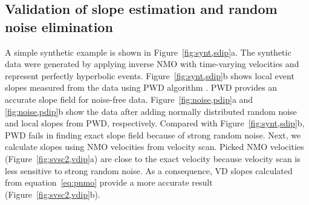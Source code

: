 \subsection{Validation of slope estimation and random noise elimination}
A simple synthetic example is shown in Figure~\ref{fig:synt,sdip}a.
The synthetic data were generated by applying inverse NMO with
time-varying velocities and represent perfectly
hyperbolic events.  Figure~\ref{fig:synt,sdip}b shows local event
slopes measured from the data using PWD algorithm
\cite[]{Fomel02}. PWD provides an accurate slope field for noise-free
data.  Figure~\ref{fig:noise,pdip}a and
\ref{fig:noise,pdip}b show the data after adding normally distributed
random noise and local slopes from PWD, respectively. Compared with
Figure~\ref{fig:synt,sdip}b, PWD fails in finding exact slope field
because of strong random noise. Next, we calculate slopes using NMO
velocities from velocity scan. Picked NMO velocities
(Figure~\ref{fig:svsc2,vdip}a) are close to the exact velocity because
velocity scan is less sensitive to strong random noise. As a
consequence, VD slopes calculated from equation~\ref{eq:pnmo} provide
a more accurate result (Figure~\ref{fig:svsc2,vdip}b).




